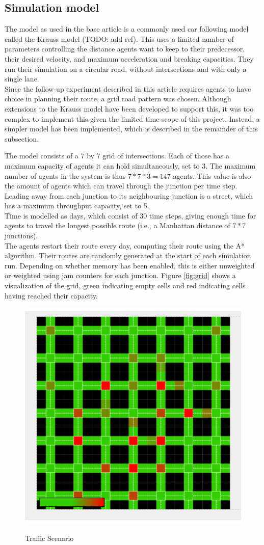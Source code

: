 \documentclass[a4paper,hidelinks]{article}
\begin{document}
\subsection{Simulation model}
The model as used in the base article is a commonly used car following model called the Krauss model (TODO: add ref). This uses a limited number of parameters controlling the distance agents want to keep to their predecessor, their desired velocity, and maximum acceleration and breaking capacities. They run their simulation on a circular road, without intersections and with only a single lane. \\
Since the follow-up experiment described in this article requires agents to have choice in planning their route, a grid road pattern was chosen. Although extensions to the Krauss model have been developed to support this, it was too complex to implement this given the limited time-scope of this project. Instead, a simpler model has been implemented, which is described in the remainder of this subsection.

The model consists of a 7 by 7 grid of intersections. Each of those has a maximum capacity of agents it can hold simultaneously, set to 3. The maximum number of agents in the system is thus $7*7*3=147$ agents. This value is also the amount of agents which can travel through the junction per time step. Leading away from each junction to its neighbouring junction is a street, which has a maximum throughput capacity, set to 5. \\
Time is modelled as days, which consist of 30 time steps, giving enough time for agents to travel the longest possible route (i.e., a Manhattan distance of $7*7$ junctions). \\
The agents restart their route every day, computing their route using the A* algorithm. Their routes are randomly generated at the start of each simulation run. Depending on whether memory has been enabled, this is either unweighted or weighted using jam counters for each junction.
Figure \ref{fig:grid} shows a visualization of the grid, green indicating empty cells and red indicating cells having reached their capacity.

\begin{figure}[ht!]
\centering
\includegraphics[width = 0.7\linewidth]{grid}
\label{fig:grid}
\caption{Traffic Scenario \label{overflow}}
\end{figure} 
\end{document}
